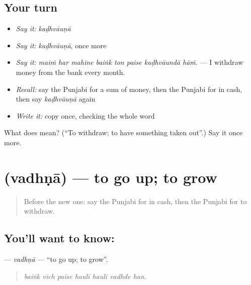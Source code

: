\subsection*{Your turn}
\begin{itemize}
\raggedright
  \item \emph{Say it:} \emph{kaḍhvāuṇā}
  \item \emph{Say it:} \emph{kaḍhvāuṇā}, once more
  \item \emph{Say it:} \emph{maiṁ har mahīne baiṅk ton paise kaḍhvāundā hāṁ.} — I withdraw money from the bank every month.
  \item \emph{Recall:} say the Punjabi for a sum of money, then the Punjabi for in cash, then say \emph{kaḍhvāuṇā} again
  \item \emph{Write it:} copy \textbf{} once, checking the whole word
\end{itemize}

\begin{tcolorbox}[breakable,colback=teal!4,colframe=teal!35!black,title={Before you move on}]
What does  mean? (\textquotedblleft{}To withdraw; to have something taken out\textquotedblright{}.) Say it once more.
\end{tcolorbox}
\section[\texorpdfstring{\pa{ਵਧਣਾ} (vadhṇā)}{ਵਧਣਾ (vadhṇā)}]{ (vadhṇā) — to go up; to grow}

\label{lesson:PA-C257-vadhna}



\begin{quote}
Before the new one: say the Punjabi for in cash, then the Punjabi for to withdraw.
\end{quote}

\subsection*{You'll want to know: }
\textbf{} — \emph{vadhṇā} — \textquotedblleft{}to go up; to grow\textquotedblright{}.

\begin{quote}
      
\end{quote}

\begin{quote}
\emph{baiṅk vich paise haulī haulī vadhde han.}
\end{quote}

